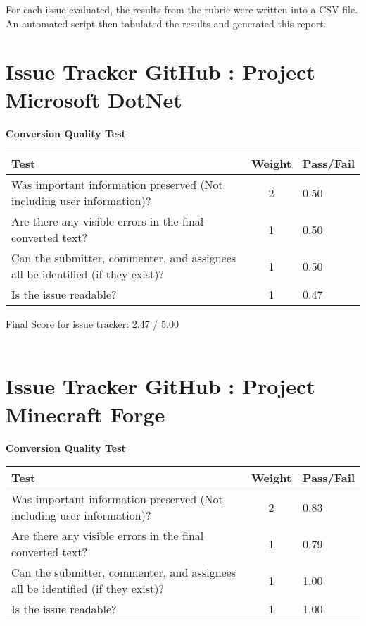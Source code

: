 \documentclass{article}
\begin{document}
    For each issue evaluated, the results from the rubric were written into a CSV file. 
    An automated script then tabulated the results and generated this report.\pagebreak\section{Issue Tracker GitHub : Project Microsoft DotNet}
\textbf{Conversion Quality Test}
\begin{center}
	\renewcommand{\arraystretch}{1.5}
	\begin{tabular}{ p{6cm} | c | l }
		Test & Weight & Pass/Fail \\ \hline
		Was important information preserved (Not including user information)? & 2 & 0.50 \\
		Are there any visible errors in the final converted text? & 1 & 0.50 \\
		Can the submitter, commenter, and assignees all be identified (if they exist)? & 1 & 0.50 \\
		Is the issue readable? & 1 & 0.47 \\
	\end{tabular}
\end{center}
Final Score for issue tracker: 2.47 / 5.00 \\ \\	\pagebreak\section{Issue Tracker GitHub : Project Minecraft Forge}
\textbf{Conversion Quality Test}
\begin{center}
	\renewcommand{\arraystretch}{1.5}
	\begin{tabular}{ p{6cm} | c | l }
		Test & Weight & Pass/Fail \\ \hline
		Was important information preserved (Not including user information)? & 2 & 0.83 \\
		Are there any visible errors in the final converted text? & 1 & 0.79 \\
		Can the submitter, commenter, and assignees all be identified (if they exist)? & 1 & 1.00 \\
		Is the issue readable? & 1 & 1.00 \\
	\end{tabular}
\end{center}
\end{document}
